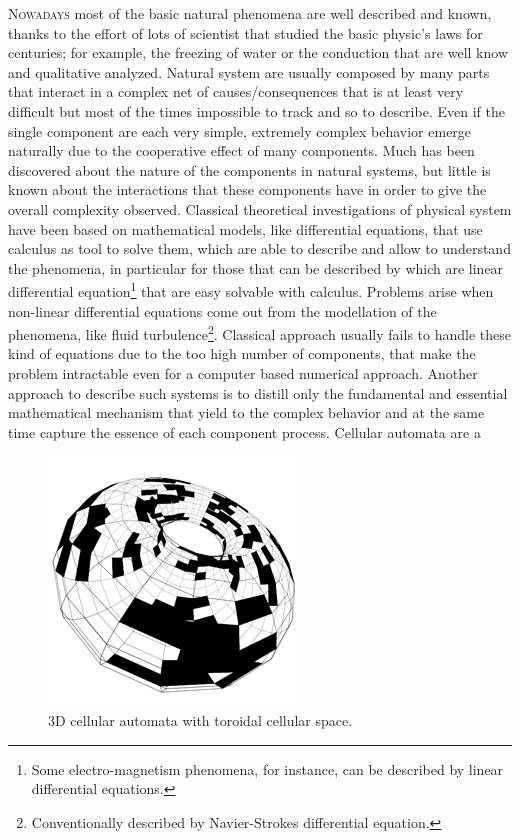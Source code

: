 \lettrine[lines=3,lhang=0.33,lraise=0,loversize=0.15]{N}{owadays} most of the basic natural phenomena are well described and known, thanks to the effort of lots of scientist that studied the basic physic's laws for centuries; for example, the freezing of water or the conduction that are well know and qualitative analyzed. Natural system are usually composed by many parts that interact in a complex net of causes/consequences that is at least very difficult but most of the times impossible to track and so to describe. Even if the single component are each very simple, extremely complex behavior emerge naturally due to the cooperative effect of many components. Much has been discovered about the nature of the components in natural systems, but little is known about the interactions that these components have in order to give the overall complexity observed.
Classical theoretical investigations of physical system have been based on
mathematical models, like differential equations, that use calculus as tool
to solve them, which are able to describe and allow to understand the
phenomena, in particular for those that can be described by which are linear
differential equation\footnote{Some electro-magnetism phenomena, for instance,
can be described by linear differential equations.} that are easy solvable with calculus.
Problems arise when non-linear differential equations come out from the
modellation of the phenomena, like fluid turbulence\footnote{Conventionally
described by Navier-Strokes differential equation.}.
Classical approach usually fails to handle these kind of equations due to the
too high number of components, that make the problem intractable even for a computer based numerical approach.
Another approach to describe such systems is to distill only the fundamental and
essential mathematical mechanism that yield to the complex behavior and at  the
same time capture the essence of each component process. Cellular automata are a
\begin{figure}
\includegraphics[scale=0.8]{./images/CA_FDM/torus-2}
\caption{3D cellular automata with toroidal cellular space.}\label{torus}
\end{figure}

